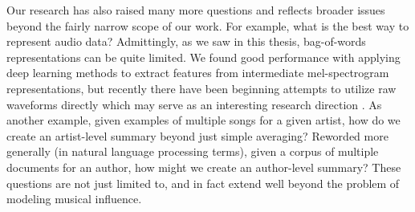 Our research has also raised many more questions and reflects broader issues beyond the fairly narrow scope of our work. For example, what is the best way to represent audio data? Admittingly, as we saw in this thesis, bag-of-words representations can be quite limited. We found good performance with applying deep learning methods to extract features from intermediate mel-spectrogram representations, but recently there have been beginning attempts to utilize raw waveforms directly which may serve as an interesting research direction \cite{gong2018how}. As another example, given examples of multiple songs for a given artist, how do we create an artist-level summary beyond just simple averaging? Reworded more generally (in natural language processing terms), given a corpus of multiple documents for an author, how might we create an author-level summary? These questions are not just limited to, and in fact extend well beyond the problem of modeling musical influence.